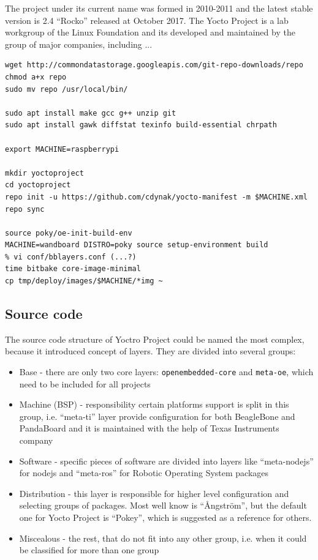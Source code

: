 \documentclass[printmode]{mgr}
\begin{document}
The project under its current name was formed in 2010-2011 and the latest stable version is 2.4 ``Rocko'' released at October 2017. The Yocto Project is a lab workgroup of the Linux Foundation and its developed and maintained by the group of major companies, including ...







\begin{lstlisting}
wget http://commondatastorage.googleapis.com/git-repo-downloads/repo
chmod a+x repo
sudo mv repo /usr/local/bin/

sudo apt install make gcc g++ unzip git
sudo apt install gawk diffstat texinfo build-essential chrpath

export MACHINE=raspberrypi

mkdir yoctoproject
cd yoctoproject
repo init -u https://github.com/cdynak/yocto-manifest -m $MACHINE.xml
repo sync

source poky/oe-init-build-env
MACHINE=wandboard DISTRO=poky source setup-environment build
% vi conf/bblayers.conf (...?)
time bitbake core-image-minimal
cp tmp/deploy/images/$MACHINE/*img ~
\end{lstlisting}


\subsection*{Source code}

The source code structure of Yoctro Project could be named the most complex, because it introduced concept of layers.
They are divided into several groups:
\begin{itemize}
    \item Base - there are only two core layers: \verb|openembedded-core| and \verb|meta-oe|, which need to be included for all projects
    \item Machine (BSP) - responsibility certain platforms support is split in this group, i.e. ``meta-ti'' layer provide configuration for both BeagleBone and PandaBoard and it is maintained with the help of Texas Instruments company
    \item Software - specific pieces of software are divided into layers like ``meta-nodejs'' for nodejs and ``meta-ros'' for Robotic Operating System packages
    \item Distribution - this layer is responsible for higher level configuration and selecting groups of packages. Most well know is ``Ångström'', but the default one for Yocto Project is ``Pokey'', which is suggested as a reference for others.
    \item Miscealous - the rest, that do not fit into any other group, i.e. when it could be classified for more than one group
\end{itemize}
\end{document}
